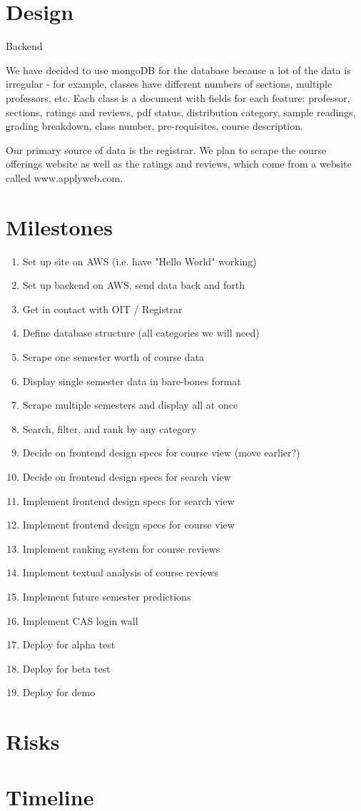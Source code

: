 \documentclass[11pt]{article}
\begin{document}
\section{Design}
\par Backend
\par We have decided to use mongoDB for the database because a lot of the data is irregular - for example, classes have different numbers of sections, multiple professors, etc. Each class is a document with fields for each feature: professor, sections, ratings and reviews, pdf status, distribution category, sample readings, grading breakdown, class number, pre-requisites, course description.
\par Our primary source of data is the registrar. We plan to scrape the course offerings website as well as the ratings and reviews, which come from a website called www.applyweb.com.

\section{Milestones}
\begin{enumerate}
\item Set up site on AWS (i.e. have "Hello World" working)
\item Set up backend on AWS, send data back and forth
\item Get in contact with OIT / Registrar
\item Define database structure (all categories we will need)
\item Scrape one semester worth of course data
\item Display single semester data in bare-bones format
\item Scrape multiple semesters and display all at once
\item Search, filter, and rank by any category
\item Decide on frontend design specs for course view (move earlier?)
\item Decide on frontend design specs for search view
\par [No particular order from here on out]
\item Implement frontend design specs for search view
\item Implement frontend design specs for course view
\item Implement ranking system for course reviews
\item Implement textual analysis of course reviews
\item Implement future semester predictions
\item Implement CAS login wall
\item Deploy for alpha test
\item Deploy for beta test
\item Deploy for demo
\end{enumerate}

\section{Risks}

\section{Timeline}
\end{document}
